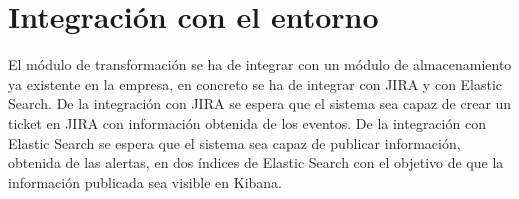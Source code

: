 \section{Integración con el entorno}
El módulo de transformación se ha de integrar con un módulo de almacenamiento ya existente en la empresa, en concreto se ha de integrar con JIRA y con Elastic Search. De la integración con JIRA se espera que el sistema sea capaz de crear un ticket en JIRA con información obtenida de los eventos. De la integración con Elastic Search se espera que el sistema sea capaz de publicar información, obtenida de las alertas, en dos índices de Elastic Search con el objetivo de que la información publicada sea visible en Kibana.





